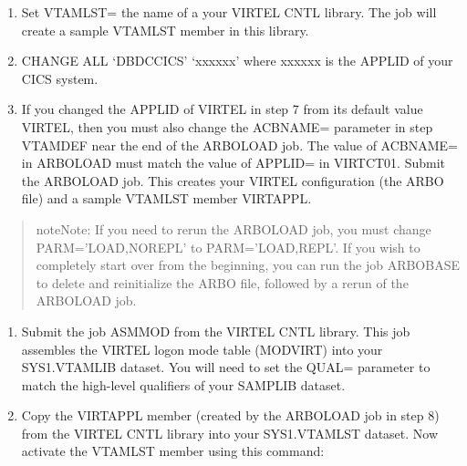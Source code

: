 \documentclass[letterpaper,10pt,english]{sphinxmanual}
\begin{document}
\begin{enumerate}
\begin{enumerate}
\item {} 
Set VTAMLST= the name of a your VIRTEL CNTL library. The job will create a sample VTAMLST member in this library.

\item {} 
CHANGE ALL ‘DBDCCICS’ ‘xxxxxx’ where xxxxxx is the APPLID of your CICS system.

\item {} 
If you changed the APPLID of VIRTEL in step 7 from its default value VIRTEL, then you must also change the ACBNAME= parameter in step VTAMDEF near the end of the ARBOLOAD job. The value of ACBNAME= in ARBOLOAD must match the value of APPLID= in VIRTCT01. Submit the ARBOLOAD job. This creates your VIRTEL configuration (the ARBO file) and a sample VTAMLST member VIRTAPPL.

\end{enumerate}

\end{enumerate}
\begin{quote}

\begin{sphinxadmonition}{note}{Note:}
If you need to rerun the ARBOLOAD job, you must change PARM=’LOAD,NOREPL’ to PARM=’LOAD,REPL’. If you wish to completely start over from the beginning, you can run the job ARBOBASE to delete and reinitialize the ARBO file, followed by a rerun of the ARBOLOAD job.
\end{sphinxadmonition}
\end{quote}
\begin{enumerate}
%
\setcounter{enumi}{9}
\item {} 
Submit the job ASMMOD from the VIRTEL CNTL library. This job assembles the VIRTEL logon mode table (MODVIRT) into your SYS1.VTAMLIB dataset. You will need to set the QUAL= parameter to match the high-level qualifiers of your SAMPLIB dataset.

\item {} 
Copy the VIRTAPPL member (created by the ARBOLOAD job in step 8) from the VIRTEL CNTL library into your SYS1.VTAMLST dataset. Now activate the VTAMLST member using this command:

\end{enumerate}
\end{document}
